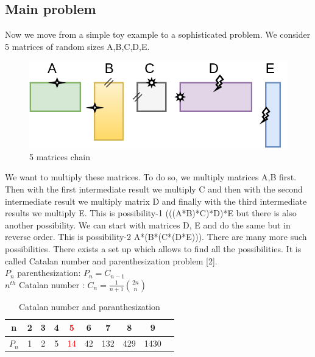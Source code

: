 \documentclass[10pts]{article}
\begin{document}
\subsection*{Main problem}
Now we move from a simple toy example to a sophisticated problem. We consider 5 matrices of random sizes A,B,C,D,E.
 \begin{figure}[h!]
 		\begin{center}
    \includegraphics[scale =0.3]{chain_matrix.png}
 	\caption{5 matrices chain}
 	\label{fig:chain_matrix}
 	\end{center}
 \end{figure}


We want to multiply these matrices. To do so, we multiply matrices A,B first. Then with the first intermediate result we multiply C and then with the second intermediate result we multiply matrix D and finally with the third intermediate results we multiply E. This is
possibility-1	(((A*B)*C)*D)*E  but there is also another possibility. We can start with matrices D, E and do the same but in reverse order. This is possibility-2	A*(B*(C*(D*E))). There are many more such possibilities. There exists a set up which allows to find all the possibilities. It is called Catalan number and parenthesization problem [2]. \\
	$P_n$ parenthesization: $P_n = C_{n-1}$ \\ 
	$n^{th}$ Catalan number : $C_n = \frac{1}{n+1} \binom{2n}{n}$ \\

\begin{table}[htp!]
	\centering
\begin{center}
	\begin{tabular}{| c |c |c| c| c| c| c| c| c| c |}
		\hline 
		n  & 2 & 3 & 4 & 	\textcolor{red}{5} & 6 & 7 & 8 & 9\\ [1ex]
		\hline 
		$P_n$ & 1 & 2 & 5 & \textcolor{red}{14} & 42 & 132 & 429 & 1430\\[1ex]
		\hline
	\end{tabular}
\end{center} 
	\caption{Catalan number and paranthesization}
	\label{table:Catalan number and paranthesization}
\end{table}
\end{document}
